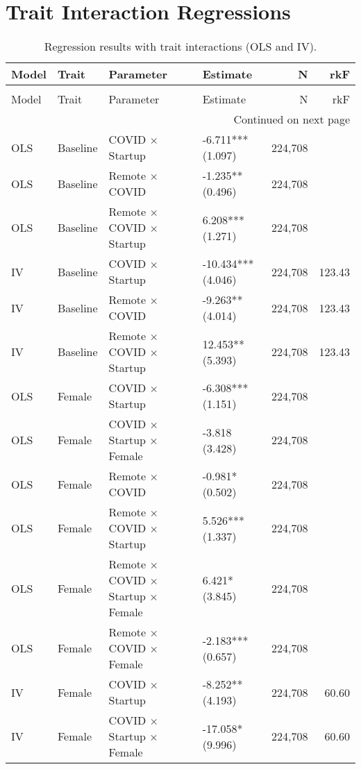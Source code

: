 \documentclass[11pt]{article}
\begin{document}
\section*{Trait Interaction Regressions}
{\small
\begin{longtable}{llllrr}
\caption{Regression results with trait interactions (OLS and IV).} \label{tab:traits-interactions} \\
\toprule
Model & Trait & Parameter & Estimate & N & rkF \\
\midrule
\endfirsthead
\caption[]{Regression results with trait interactions (OLS and IV).} \\
\toprule
Model & Trait & Parameter & Estimate & N & rkF \\
\midrule
\endhead
\midrule
\multicolumn{6}{r}{Continued on next page} \\
\midrule
\endfoot
\bottomrule
\endlastfoot
OLS & Baseline & COVID $\times$ Startup & -6.711*** (1.097) & 224,708 &  \\
OLS & Baseline & Remote $\times$ COVID & -1.235** (0.496) & 224,708 &  \\
OLS & Baseline & Remote $\times$ COVID $\times$ Startup &  6.208*** (1.271) & 224,708 &  \\
IV & Baseline & COVID $\times$ Startup & -10.434*** (4.046) & 224,708 & 123.43 \\
IV & Baseline & Remote $\times$ COVID & -9.263** (4.014) & 224,708 & 123.43 \\
IV & Baseline & Remote $\times$ COVID $\times$ Startup &  12.453** (5.393) & 224,708 & 123.43 \\
OLS & Female & COVID $\times$ Startup & -6.308*** (1.151) & 224,708 &  \\
OLS & Female & COVID $\times$ Startup × Female & -3.818 (3.428) & 224,708 &  \\
OLS & Female & Remote $\times$ COVID & -0.981* (0.502) & 224,708 &  \\
OLS & Female & Remote $\times$ COVID $\times$ Startup &  5.526*** (1.337) & 224,708 &  \\
OLS & Female & Remote $\times$ COVID $\times$ Startup × Female &  6.421* (3.845) & 224,708 &  \\
OLS & Female & Remote $\times$ COVID × Female & -2.183*** (0.657) & 224,708 &  \\
IV & Female & COVID $\times$ Startup & -8.252** (4.193) & 224,708 & 60.60 \\
IV & Female & COVID $\times$ Startup × Female & -17.058* (9.996) & 224,708 & 60.60 \\

\end{longtable}}
\end{document}
